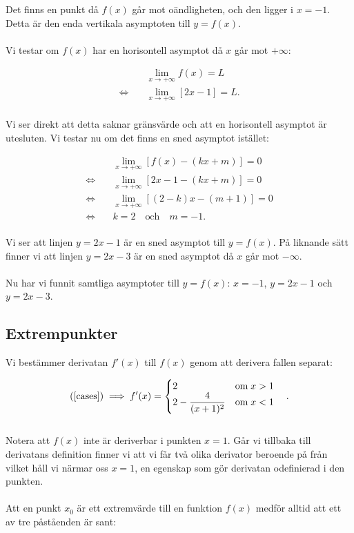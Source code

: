 \documentclass{article}
\begin{document}
\noindent Det finns en punkt då $f(x)$ går mot oändligheten, och den ligger i $x = -1$. Detta är den enda vertikala asymptoten till $y = f(x)$.
\\
\\
Vi testar om $f(x)$ har en horisontell asymptot då $x$ går mot $+\infty$:

\begin{align*}
  & \lim_{x \to +\infty}f(x) = L\\
  \iff \quad & \lim_{x \to +\infty}[2x - 1] = L\text{.}
\end{align*}
\\
Vi ser direkt att detta saknar gränsvärde och att en horisontell asymptot är utesluten. Vi testar nu om det finns en sned asymptot istället:

\begin{align*}
  & \lim_{x \to +\infty}[f(x) - (kx + m)] = 0\\
  \iff \quad & \lim_{x \to +\infty}[2x - 1 - (kx + m)] = 0\\
  \iff \quad & \lim_{x \to +\infty}[(2 - k)x - (m + 1)] = 0\\
  \iff \quad & k = 2 \quad \text{och} \quad m = -1\text{.}
\end{align*}
\\
Vi ser att linjen $y = 2x - 1$ är en sned asymptot till $y = f(x)$. På liknande sätt finner vi att linjen $y = 2x -3$ är en sned asymptot då $x$ går mot $-\infty$.
\\
\\
Nu har vi funnit samtliga asymptoter till $y = f(x)$: $x = -1$, $y = 2x -1$ och $y = 2x - 3$.


\subsection*{Extrempunkter}

\noindent Vi bestämmer derivatan $f'(x)$ till $f(x)$ genom att derivera fallen separat:

\begin{gather*}
  \text{(\ref{cases})} \implies f'(x) =
  \begin{cases}
    \begin{aligned}[t]
      & 2 & \text{om} \; x > 1 \\
      & 2 - \frac{4}{(x + 1)^{2}} & \text{om} \; x < 1
    \end{aligned}
  \end{cases}\text{.}
\end{gather*}
\\
Notera att $f(x)$ inte är deriverbar i punkten $x = 1$. Går vi tillbaka till derivatans definition finner vi att vi får två olika derivator beroende på från vilket håll vi närmar oss $x = 1$, en egenskap som gör derivatan odefinierad i den punkten.
\\
\\
Att en punkt $x_{0}$ är ett extremvärde till en funktion $f(x)$ medför alltid att ett av tre påståenden är sant:
\end{document}
